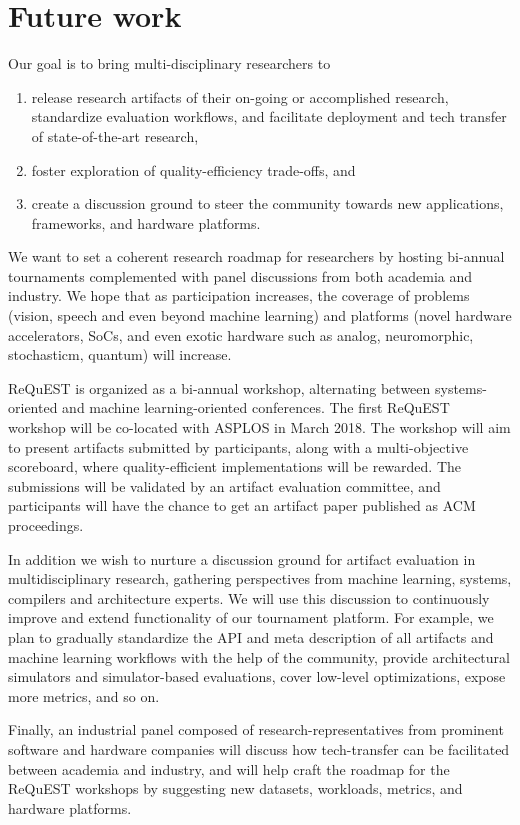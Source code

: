 \documentclass[10pt,letterpaper,twocolumn]{article}
\begin{document}
\section{Future work}

Our goal is to bring multi-disciplinary researchers to 
\begin{enumerate}
  \item release research artifacts of their on-going or accomplished research,
standardize evaluation workflows, and facilitate deployment
and tech transfer of state-of-the-art research,
  \item foster exploration of quality-efficiency trade-offs, and 
  \item create a discussion ground to steer the community towards new
applications, frameworks, and hardware platforms.
\end{enumerate}

We want to set a coherent research roadmap for
researchers by hosting bi-annual tournaments complemented with
panel discussions from both academia and industry. We hope
that as participation increases, the coverage of problems
(vision, speech and even beyond machine learning) and
platforms (novel hardware accelerators, SoCs, and even exotic
hardware such as analog, neuromorphic, stochasticm, quantum) will increase.

ReQuEST is organized as a bi-annual workshop, alternating
between systems-oriented and machine learning-oriented
conferences. The first ReQuEST workshop will be co-located
with ASPLOS in March 2018. The workshop will aim to present
artifacts submitted by participants, along with
a multi-objective scoreboard, where quality-efficient
implementations will be rewarded. 
The submissions will be validated by an artifact evaluation committee, 
and participants will have the chance to get an artifact paper
published as ACM proceedings. 

In addition we wish to nurture
a discussion ground for artifact evaluation in multidisciplinary
research, gathering perspectives from machine learning,
systems, compilers and architecture experts. 
%
We will use this discussion to continuously improve and extend 
functionality of our tournament platform.
%
For example, we plan to gradually standardize the API and meta description of all artifacts 
and machine learning workflows with the help of the community, 
provide architectural simulators and simulator-based evaluations, 
cover low-level optimizations, expose more metrics, and so on. 

Finally, an industrial panel composed of research-representatives from
prominent software and hardware companies will discuss how
tech-transfer can be facilitated between academia and
industry, and will help craft the roadmap for the ReQuEST
workshops by suggesting new datasets, workloads, metrics, and
hardware platforms.




\end{document}
